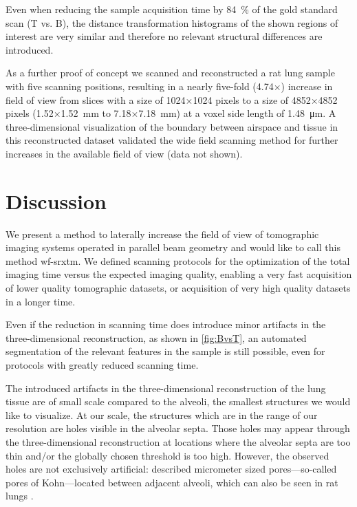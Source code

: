 Even when reducing the sample acquisition time by \SI{84}{\percent} of the gold standard scan (T vs. B), the distance transformation histograms of the shown regions of interest are very similar and therefore no relevant structural differences are introduced.

As a further proof of concept we scanned and reconstructed a rat lung sample with five scanning positions, resulting in a nearly five-fold (4.74$\times$) increase in field of view from slices with a size of 1024$\times$1024 pixels to a size of 4852$\times$4852 pixels (1.52$\times$\SI{1.52}{\milli\meter} to 7.18$\times$\SI{7.18}{\milli\meter}) at a voxel side length of \SI{1.48}{\micro\meter}. A three-dimensional visualization of the boundary between airspace and tissue in this reconstructed dataset validated the wide field scanning method for further increases in the available field of view (data not shown).

\section{Discussion}\label{sec:Discussion}
We present a method to laterally increase the field of view of tomographic imaging systems operated in parallel beam geometry and would like to call this method \ac{wf-srxtm}. We defined scanning protocols for the optimization of the total imaging time versus the expected imaging quality, enabling a very fast acquisition of lower quality tomographic datasets, or acquisition of very high quality datasets in a longer time.

Even if the reduction in scanning time does introduce minor artifacts in the three-dimensional reconstruction, as shown in \autoref{fig:BvsT}, an automated segmentation of the relevant features in the sample is still possible, even for protocols with greatly reduced scanning time. 

The introduced artifacts in the three-dimensional reconstruction of the lung tissue are of small scale compared to the alveoli, the smallest structures we would like to visualize. At our scale, the structures which are in the range of our resolution are holes visible in the alveolar septa. Those holes may appear through the three-dimensional reconstruction at locations where the alveolar septa are too thin and/or the globally chosen threshold is too high. However, the observed holes are not exclusively artificial: \citet{Kohn1893} described micrometer sized pores---so-called pores of Kohn---located between adjacent alveoli, which can also be seen in rat lungs \cite{Vanmeir1991}.

